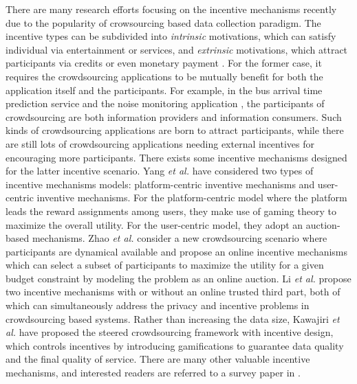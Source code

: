 There are many research efforts focusing on the incentive mechanisms recently due to the popularity of crowsourcing based data collection paradigm. The incentive types can be subdivided into \textit{intrinsic} motivations, which can satisfy individual via entertainment or services, and \textit{extrinsic} motivations, which attract participants via credits or even monetary payment \cite{onesize}. For the former case, it requires the crowdsourcing applications to be mutually benefit for both the application itself and the participants. For example, in the bus arrival time prediction service \cite{bustime} and the noise monitoring application \cite{earphone}, the participants of crowdsourcing are both information providers and information consumers. Such kinds of crowdsourcing applications are born to attract participants, while there are still lots of crowdsourcing applications needing external incentives for encouraging more participants. There exists some incentive mechanisms designed for the latter incentive scenario. Yang \textit{et al.} \cite{incentivecom} have considered two types of incentive mechanisms models: platform-centric inventive mechanisms and user-centric inventive mechanisms. For the platform-centric model where the platform leads the reward assignments among users, they make use of gaming theory to maximize the overall utility. For the user-centric model, they adopt an auction-based mechanisms. Zhao \textit{et al.} \cite{incentiveutility} consider a new crowdsourcing scenario where participants are dynamical available and propose an online incentive mechanisms which can select a subset of participants to maximize the utility for a given budget constraint by modeling the problem as an online auction. Li \textit{et al.} \cite{privacyincentive} propose two incentive mechanisms with or without an online trusted third part, both of which can simultaneously address the privacy and incentive problems in crowdsourcing based systems. Rather than increasing the data size, Kawajiri \textit{et al.} \cite{steered} have proposed the steered crowdsourcing framework with incentive design, which controls incentives by introducing gamifications to guarantee data quality and the final quality of service. There are many other valuable incentive mechanisms, and interested readers are referred to a survey paper in \cite{surveyincentives}.







